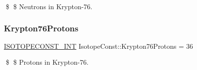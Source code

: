 \$ \$ Neutrons in Krypton-\/76. \mbox{\label{group___isotope_const-_krypton-_kr76_ga431d772ba975b483e171c1cb7c047c5c}} 
\subsubsection{\texorpdfstring{Krypton76\+Protons}{Krypton76Protons}}
{\footnotesize\ttfamily \mbox{\hyperlink{group___isotope_const-_macros_ga5f18360b3e99483a35c32d789e62621c}{I\+S\+O\+T\+O\+P\+E\+C\+O\+N\+S\+T\+\_\+\+I\+NT}} Isotope\+Const\+::\+Krypton76\+Protons = 36}

\$ \$ Protons in Krypton-\/76. 